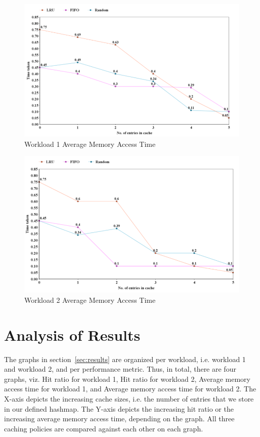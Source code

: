 \documentclass[11pt,pdftex,twocolumn]{article}
\begin{document}
\begin{figure}[!h]
\centering
\includegraphics[scale=0.3]{images/workload12.png}
\caption{Workload 1 Average Memory Access Time}
\label{img:w1at}
\end{figure}

\begin{figure}[!h]
\centering
\includegraphics[scale=0.3]{images/workload22.png}
\caption{Workload 2 Average Memory Access Time}
\label{img:w2at}
\end{figure}

\section{Analysis of Results}
\label{sec:analysis}
The graphs in section~\ref{sec:results} are organized per workload, i.e. workload 1 and workload 2, and per performance metric. Thus, in total, there are four graphs, viz. Hit ratio for workload 1, Hit ratio for workload 2, Average memory access time for workload 1, and Average memory access time for workload 2. The X-axis depicts the increasing cache sizes, i.e. the number of entries that we store in our defined hashmap. The Y-axis depicts the increasing hit ratio or the increasing average memory access time, depending on the graph. All three caching policies are compared against each other on each graph.
\end{document}

